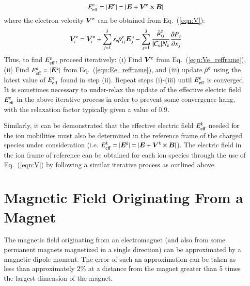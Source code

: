 \documentclass{warpdoc}
\newcommand{\nd}{3}
\renewcommand{\vec}[1]{\bm{#1}}
\begin{document}
%
\begin{equation}
 E_{\rm eff}^{\rm e}=|\vec{E}^{\rm e}|=|\vec{E}+\vec{V}^{\rm e}\times\vec{B}| 
\label{eqn:Ee_refframe}
\end{equation}
%
where the electron velocity $\vec{V}^{\rm e}$ can be obtained from Eq.\ (\ref{eqn:V}):
%
\begin{equation}
  \vec{V}^{\rm e}_i = \vec{V}^{\rm n}_i+\sum_{j=1}^\nd s_{\rm e} \wtilde{\mu}^{\rm e}_{ij}  \vec{E}_j^{\rm n}
             - \sum_{j=1}^\nd  \frac{\wtilde{\mu}^{\rm e}_{ij}}{|C_{\rm e}| N_{\rm e}} \frac{\partial P_{\rm e}}{\partial x_j}
\label{eqn:Ve_refframe}
\end{equation}
%
Thus, to find $E_{\rm eff}^{\rm e}$, proceed iteratively: (i) Find $\vec{V}^{\rm e}$ from Eq.\ (\ref{eqn:Ve_refframe}), (ii) Find $E_{\rm eff}^{\rm e}=|\vec{E}^{\rm e}|$ from Eq.\ (\ref{eqn:Ee_refframe}), and (iii) update $\tilde{\mu}^{\rm e}$ using the latest value of $E_{\rm eff}^{\rm e}$ found in step (ii). Repeat steps (i)-(iii) until $E_{\rm eff}^{\rm e}$ is converged. It is sometimes necessary to under-relax the update of the effective electric field $E_{\rm eff}^{\rm e}$ in the above iterative process in order to prevent some convergence hang, with the relaxation factor typically given a value of 0.9.   

Similarly, it can be demonstrated that the effective electric field  $E_{\rm eff}^k$ needed for the ion mobilities  must also be determined in the reference frame of the charged species under consideration (i.e. $E_{\rm eff}^k=|\vec{E}^k|=|\vec{E}+\vec{V}^k\times \vec{B}|$). The electric field in the ion frame of reference can be obtained for each ion species through the use of Eq.\ (\ref{eqn:V}) by following a similar iterative process as  outlined above. 



\section{Magnetic Field Originating From a Magnet}

The magnetic field originating from an electromagnet (and also from some permanent magnets
magnetized in a single direction) can be approximated by a magnetic dipole moment. The error
of such an approximation can be taken as less than approximately 2\% at a distance from
the magnet greater than 5 times the largest dimension of the magnet.
\end{document}
